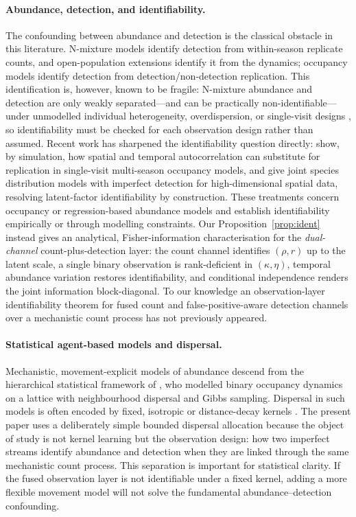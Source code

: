 \documentclass[preprint,12pt]{elsarticle}
\theoremstyle{definition}
\begin{document}
\paragraph{Abundance, detection, and identifiability.}
The confounding between abundance and detection is the classical obstacle in
this literature. N-mixture models \citep{royle2004} identify detection from
within-season replicate counts, and open-population extensions
\citep{dail2011} identify it from the dynamics; occupancy models identify
detection from detection/non-detection replication. This identification
is, however, known to be fragile: N-mixture abundance and detection are only
weakly separated---and can be practically non-identifiable---under unmodelled
individual heterogeneity, overdispersion, or single-visit designs
\citep{link2003,knape2015,barker2018}, so identifiability must be checked for
each observation design rather than assumed. Recent work has
sharpened the identifiability question directly: \citet{doser2024} show, by
simulation, how spatial and temporal autocorrelation can substitute for
replication in single-visit multi-season occupancy models, and
\citet{doser2023} give joint species distribution models with imperfect
detection for high-dimensional spatial data, resolving latent-factor
identifiability by construction. These treatments concern occupancy or
regression-based abundance models and establish identifiability empirically
or through modelling constraints. Our Proposition~\ref{prop:ident} instead
gives an analytical, Fisher-information characterisation for the
\emph{dual-channel} count-plus-detection layer: the count channel identifies
$(\rho,r)$ up to the latent scale, a single binary observation is
rank-deficient in $(\kappa,\eta)$, temporal abundance variation restores
identifiability, and conditional independence renders the joint information
block-diagonal. To our knowledge an observation-layer identifiability
theorem for fused count and false-positive-aware detection channels over a
mechanistic count process has not previously appeared.

\paragraph{Statistical agent-based models and dispersal.}
Mechanistic, movement-explicit models of abundance descend from the
hierarchical statistical framework of \citet{hooten2010}, who modelled
binary occupancy dynamics on a lattice with neighbourhood dispersal and
Gibbs sampling. Dispersal in such models is often encoded by fixed,
isotropic or distance-decay kernels \citep{nathan2012}. The present paper
uses a deliberately simple bounded dispersal allocation because the object of
study is not kernel learning but the observation design: how two imperfect
streams identify abundance and detection when they are linked through the
same mechanistic count process. This separation is important for statistical
clarity. If the fused observation layer is not identifiable under a fixed
kernel, adding a more flexible movement model will not solve the fundamental
abundance--detection confounding.
\end{document}
